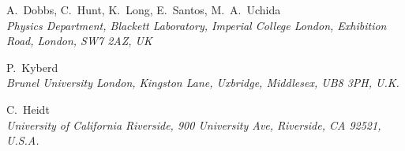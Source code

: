 \clearpage
\thispagestyle{plain}
\setlength\parindent{0em}%
  A.~Dobbs, C.~Hunt, K.~Long, E.~Santos, M.~A.~Uchida
  \\{\it
    Physics Department, Blackett Laboratory, Imperial College London,
    Exhibition Road, London, SW7 2AZ, UK
  }
  \par \filbreak
  P.~Kyberd
  \\{\it
    Brunel University London, Kingston Lane, Uxbridge,
    Middlesex, UB8 3PH, U.K.
  } \\ 
  \par \filbreak
  C.~Heidt
  \\{\it
    University of California Riverside,
    900 University Ave, Riverside, CA 92521, U.S.A.
  } \\ 
  \par \filbreak
